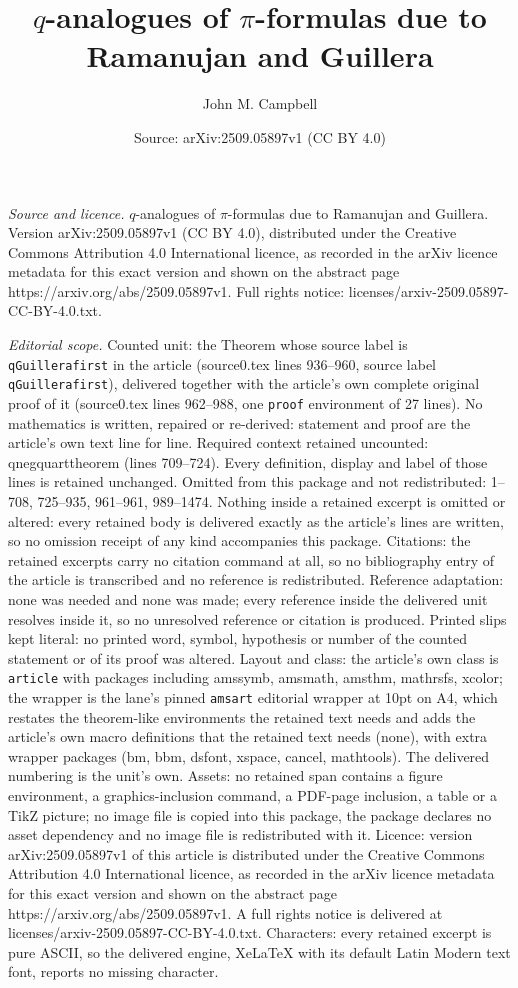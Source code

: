 \documentclass[10pt,a4paper]{amsart}
\title[$q$-analogues of $\pi$-formulas due to Ramanujan and Guiller]{$q$-analogues of $\pi$-formulas due to Ramanujan and Guillera}
\author{John M. Campbell}
\date{Source: arXiv:2509.05897v1 (CC BY 4.0)}
\begin{document}
\maketitle

\noindent\emph{Source and licence.} $q$-analogues of $\pi$-formulas due to Ramanujan and Guillera. Version arXiv:2509.05897v1 (CC BY 4.0), distributed under the Creative Commons Attribution 4.0 International licence, as recorded in the arXiv licence metadata for this exact version and shown on the abstract page https://arxiv.org/abs/2509.05897v1. Full rights notice: licenses/arxiv-2509.05897-CC-BY-4.0.txt.\par\smallskip

\noindent\textit{Editorial scope.} Counted unit: the Theorem whose source label is \texttt{qGuillerafirst} in the article (source0.tex lines 936--960, source label \texttt{qGuillerafirst}), delivered together with the article's own complete original proof of it (source0.tex lines 962--988, one \texttt{proof} environment of 27 lines). No mathematics is written, repaired or re-derived: statement and proof are the article's own text line for line. Required context retained uncounted: qnegquarttheorem (lines 709--724). Every definition, display and label of those lines is retained unchanged. Omitted from this package and not redistributed: 1--708, 725--935, 961--961, 989--1474. Nothing inside a retained excerpt is omitted or altered: every retained body is delivered exactly as the article's lines are written, so no omission receipt of any kind accompanies this package. Citations: the retained excerpts carry no citation command at all, so no bibliography entry of the article is transcribed and no reference is redistributed. Reference adaptation: none was needed and none was made; every reference inside the delivered unit resolves inside it, so no unresolved reference or citation is produced. Printed slips kept literal: no printed word, symbol, hypothesis or number of the counted statement or of its proof was altered. Layout and class: the article's own class is \texttt{article} with packages including amssymb, amsmath, amsthm, mathrsfs, xcolor; the wrapper is the lane's pinned \texttt{amsart} editorial wrapper at 10pt on A4, which restates the theorem-like environments the retained text needs and adds the article's own macro definitions that the retained text needs (none), with extra wrapper packages (bm, bbm, dsfont, xspace, cancel, mathtools). The delivered numbering is the unit's own. Assets: no retained span contains a figure environment, a graphics-inclusion command, a PDF-page inclusion, a table or a TikZ picture; no image file is copied into this package, the package declares no asset dependency and no image file is redistributed with it. Licence: version arXiv:2509.05897v1 of this article is distributed under the Creative Commons Attribution 4.0 International licence, as recorded in the arXiv licence metadata for this exact version and shown on the abstract page https://arxiv.org/abs/2509.05897v1. A full rights notice is delivered at licenses/arxiv-2509.05897-CC-BY-4.0.txt. Characters: every retained excerpt is pure ASCII, so the delivered engine, XeLaTeX with its default Latin Modern text font, reports no missing character.
\end{document}
